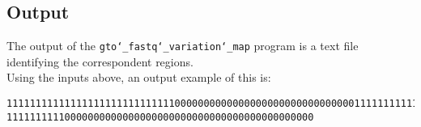 \subsection*{Output}

The output of the \texttt{gto\char`_fastq\char`_variation\char`_map} program is a text file identifying the correspondent regions.\\
Using the inputs above, an output example of this is:

\begin{lstlisting}
1111111111111111111111111111100000000000000000000000000000001111111111111111111
11111111110000000000000000000000000000000000000000000
\end{lstlisting}